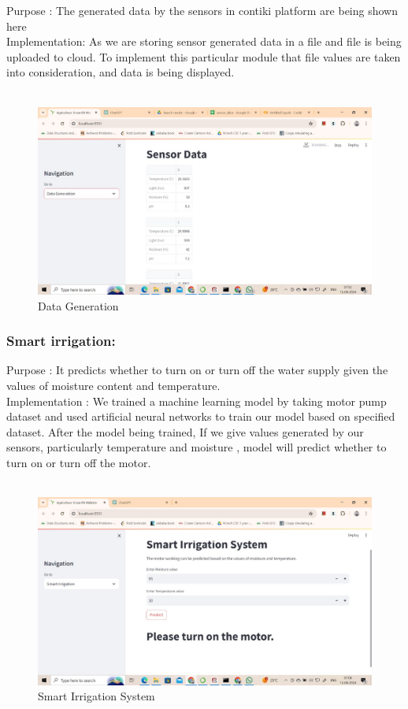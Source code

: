 \documentclass{article}
\begin{document}
Purpose : The generated data by the sensors in contiki platform are being shown here \\
Implementation: As we are storing sensor generated data in a file and file is being uploaded to cloud. To implement this particular module that file values are taken into consideration, and data is being displayed.
\\
\\
\begin{figure}[h]
    \centering
    \includegraphics[width=1.0\textwidth]{Data_generation.jpg}
     
    \caption{Data Generation}
    \label{fig:example}
\end{figure}
\newpage
\subsubsection{Smart irrigation:}

Purpose : It predicts whether to turn on or turn off the water supply given the values of moisture content and temperature.\\
Implementation : We trained a machine learning model by taking motor pump dataset and used artificial neural networks to train our model based on specified dataset. After the model being trained, If we give values generated by our sensors, particularly temperature and moisture , model will predict whether to turn on or turn off the motor. 
\\
\\
\begin{figure}[h]
    \centering
    \includegraphics[width=1.0\textwidth]{smart_irrigation_system.jpg}
    \caption{Smart Irrigation System}
    \label{fig:example}
\end{figure}
\newpage
\end{document}
